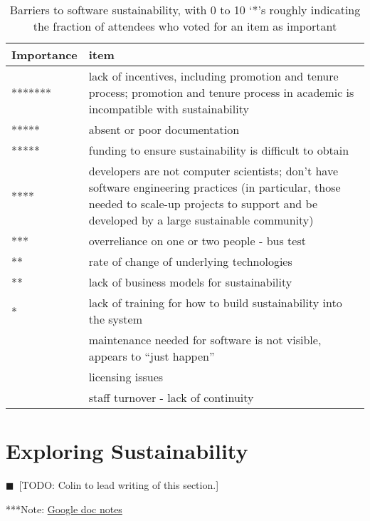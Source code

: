 \documentclass[11pt, oneside]{amsart}
\newcommand{\todo}[1]{{\color{blue}$\blacksquare$~\textsf{[TODO: #1]}}}
\newcommand{\note}[1]{ {\textcolor{blueish}    { ***Note:      #1 }}}
\begin{document}
\begin{table*}[ht]
\begin{center}
\caption{Barriers to software sustainability, with 0 to 10 `*'s roughly
indicating the fraction of attendees who voted for an item as important}
    \begin{scriptsize}
    \begin{tabular}{ | p{1.65cm} | p{10.0cm} |}
    \hline
  Importance & item \\ \hline \hline
******* & lack of incentives, including promotion and tenure process; promotion
and tenure process in academic is incompatible with sustainability \\ \hline
*****  & absent or poor documentation \\ \hline
***** & funding to ensure sustainability is difficult to obtain \\ \hline
**** & developers are not computer scientists; don't have software engineering
practices (in particular, those needed to scale-up projects to support and be
developed by a large sustainable community) \\ \hline
*** & overreliance on one or two people - bus test \\ \hline
** & rate of change of underlying technologies \\ \hline
** & lack of business models for sustainability \\ \hline
* & lack of training for how to build sustainability into the system \\ \hline
 & maintenance needed for software is not visible, appears to ``just happen'' \\ \hline
 & licensing issues \\ \hline
 & staff turnover - lack of continuity \\ \hline
    \end{tabular}
    \end{scriptsize}
    \label{tb:software_sustainability_barriers}
\end{center}   
\end{table*} 


\section{Exploring Sustainability} \label{sec:exploring}
\todo{Colin to lead writing of this section.}

\note{\href{http://tinyurl.com/mpbhvyb}{Google doc notes}}
\end{document}

